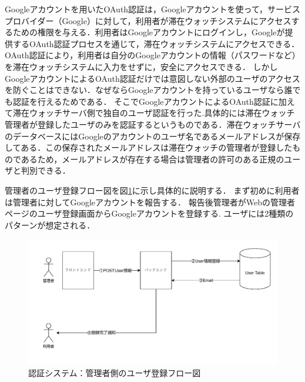 Googleアカウントを用いたOAuth認証は，Googleアカウントを使って，サービスプロバイダー（Google）に対して，利用者が滞在ウォッチシステムにアクセスするための権限を与える．利用者はGoogleアカウントにログインし，Googleが提供するOAuth認証プロセスを通じて，滞在ウォッチシステムにアクセスできる．
OAuth認証により，利用者は自分のGoogleアカウントの情報（パスワードなど）を滞在ウォッチシステムに入力をせずに，安全にアクセスできる．
しかしGoogleアカウントによるOAuth認証だけでは意図しない外部のユーザのアクセスを防ぐことはできない．なぜならGoogleアカウントを持っているユーザなら誰でも認証を行えるためである．
そこでGoogleアカウントによるOAuth認証に加えて滞在ウォッチサーバ側で独自のユーザ認証を行った.具体的には滞在ウォッチ管理者が登録したユーザのみを認証するというものである．滞在ウォッチサーバのデータベースにはGoogleのアカウントのユーザ名であるメールアドレスが保存してある．この保存されたメールアドレスは滞在ウォッチの管理者が登録したものであるため，メールアドレスが存在する場合は管理者の許可のある正規のユーザと判別できる．



管理者のユーザ登録フロー図を図\ref{fig:registerUser}に示し具体的に説明する．
まず初めに利用者は管理者に対してGoogleアカウントを報告する．
報告後管理者がWebの管理者ページのユーザ登録画面からGoogleアカウントを登録する.
ユーザには2種類のパターンが想定される．

\begin{figure}[h]
  \centering  %
  \includegraphics[clip,scale = 0.7]{image/regsiterUser.pdf}
  \caption{認証システム：管理者側のユーザ登録フロー図}    \label{fig:registerUser}
\end{figure}



